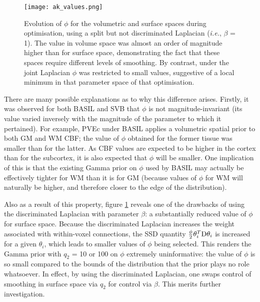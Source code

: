 \begin{figure}[H]
\centering
\texttt{[image: ak\_values.png]}
\caption{Evolution of $\phi$ for the volumetric and surface spaces during optimisation, using a split but not discriminated Laplacian (\textit{i.e.}, $\beta$ = 1). The value in volume space was almost an order of magnitude higher than for surface space, demonstrating the fact that these spaces require different levels of smoothing. By contrast, under the joint Laplacian $\phi$ was restricted to small values, suggestive of a local minimum in that parameter space of that optimisation.}
\label{ak_values} 
\end{figure}

There are many possible explanations as to why this difference arises. Firstly, it was observed for both BASIL and SVB that $\phi$ is not magnitude-invariant (its value varied inversely with the magnitude of the parameter to which it pertained). For example, PVEc under BASIL applies a volumetric spatial prior to both GM and WM CBF; the value of $\phi$ obtained for the former tissue was smaller than for the latter. As CBF values are expected to be higher in the cortex than for the subcortex, it is also expected that $\phi$ will be smaller. One implication of this is that the existing Gamma prior on $\phi$ used by BASIL may actually be effectively tighter for WM than it is for GM (because values of $\phi$ for WM will naturally be higher, and therefore closer to the edge of the distribution). 

Also as a result of this property, figure \ref{ak_values} reveals one of the drawbacks of using the discriminated Laplacian with parameter $\beta$: a substantially reduced value of $\phi$ for surface space. Because the discriminated Laplacian increases the weight associated with within-voxel connections, the SSD quantity $\frac{\phi}{2}\theta_i^T\mathrm{D}\theta_i$ is increased for a given $\theta_i$, which leads to smaller values of $\phi$ being selected. This renders the Gamma prior with $q_2$ = 10 or 100 on $\phi$ extremely uninformative: the value of $\phi$ is so small compared to the bounds of the distribution that the prior plays no role whatsoever. In effect, by using the discriminated Laplacian, one swaps control of smoothing in surface space via $q_2$ for control via $\beta$. This merits further investigation. 

